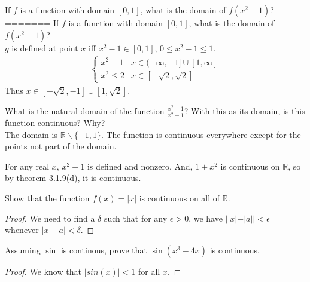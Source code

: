 \documentclass[12pt]{book}
\newcommand{\R}{\mathbb{R}}
\newenvironment{exercise}[2][Exercise]{\begin{trivlist}
\item[\hskip \labelsep {\bfseries #1}\hskip \labelsep {\bfseries #2.}]}{\end{trivlist}}
\begin{document}
\begin{exercise}{3.1.1}
If $f$ is a function with domain $[0,1]$, what is the domain of $f(x^2-1)$?\\
=======
    If $f$ is a function with domain $[0,1]$, what is the domain of $f(x^2 -1)$? \\

    $g$ is defined at point $x$ iff $x^2-1 \in [0,1]$, $0 \leq x^2-1 \leq 1$.
    \begin{align*}
        \begin{cases}
            x^2-1 & x\in (-\infty,-1] \cup [1,\infty] \\
            x^2 \leq 2 & x \in [-\sqrt{2},\sqrt{2}]
         \end{cases}
    \end{align*}
    Thus $x \in [-\sqrt{2},-1] \cup [1,\sqrt{2}]$.
\end{exercise}

\begin{exercise}{3.1.2}
What is the natural domain of the function $\frac{x^2 +1}{x^2-1}$? With this as its domain, is this function continuous? Why? \\

The domain is $\R \backslash \{-1,1\}$. The function is continuous everywhere except for the points not part of the domain.
\end{exercise}

\begin{exercise}{3.1.3}
For any real $x$, ${x^2+1}$ is defined and nonzero. And, $1+x^2$ is continuous on $\mathbb{R}$, so by theorem 3.1.9(d), it is continuous.
\end{exercise}

\begin{exercise}{3.1.4}
Show that the function $f(x) = |x|$ is continuous on all of $\R$.

	\begin{proof}
	We need to find a $\delta$ such that for any $\epsilon > 0$, we have $||x| - |a|| < \epsilon$ whenever $|x-a|< \delta$.
	\end{proof}
\end{exercise}

\begin{exercise}{3.1.5}
Assuming $\sin$ is continous, prove that $\sin(x^3-4x)$ is continuous.

	\begin{proof}
	We know that $|sin(x)| < 1$ for all $x$.
	\end{proof}
\end{exercise}
\end{document}
